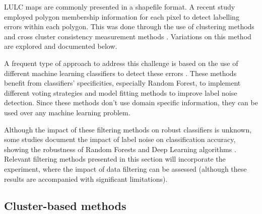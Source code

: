 \documentclass[12pt, english, openany]{book}
\begin{document}
LULC maps are commonly presented in a shapefile format. A recent study
employed polygon membership information for each pixel to detect labelling
errors within each polygon. This was done through the use of clustering methods
and cross cluster consistency measurement methods \cite{Paris2019}. Variations
on this method are explored and documented below.

A frequent type of approach to address this challenge is based on the use of
different machine learning classifiers to detect these errors
\cite{Brodley1999, Jiang2004, Liu2008, Yuan2018, Zhang2018,
Pelletier2017Filtering, Garcia-Gil2019, Boukir2019, Zhang2019}. These methods
benefit from classifiers' specificities, especially Random Forest, to implement
different voting strategies and model fitting methods to improve label noise
detection. Since these methods don't use domain specific information, they can
be used over any machine learning problem.

Although the impact of these filtering methods on robust classifiers is
unknown, some studies document the impact of label noise on classification
accuracy, showing the robustness of Random Forests and Deep Learning algorithms
\cite{Pelletier2017Effect, Rolnick2017}. Relevant filtering methods presented
in this section will incorporate the experiment, where the impact of data
filtering can be assessed (although these results are accompanied with
significant limitations).

\subsection*{Cluster-based methods}
\end{document}
